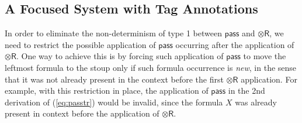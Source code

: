 \documentclass[submission,copyright,creativecommons]{eptcs}
\theoremstyle{definition}
\newcommand{\tr}{\otimes \mathsf{R}}
\newcommand{\lright}{{\multimap}\mathsf{R}}
\newcommand{\lleft}{{\multimap}\mathsf{L}}
\newcommand{\pass}{\mathsf{pass}}
\newcommand{\ax}{\mathsf{ax}}
\newcommand{\ot}{\otimes}
\newcommand{\lolli}{\multimap}
\newcommand{\RI}{\mathsf{RI}}
\newcommand{\LI}{\mathsf{LI}}
\newcommand{\Pass}{\mathsf{P}}
\newcommand{\F}{\mathsf{F}}
\newcommand{\NMILL}{\texttt{NMILL}}
\newcommand{\SkNMILL}{\NMILL\textsuperscript{\textit{s}}}
\begin{document}
%

\subsection{A Focused System with Tag Annotations}\label{sec:tag}

In order to eliminate the non-determinism of type 1 between $\pass$ and $\tr$, we need to restrict the possible application of $\pass$ occurring after the application of $\tr$. 
One way to achieve this is by forcing such application of $\pass$ to move the leftmost formula to the stoup only if such formula occurrence is \emph{new}, in the sense that it was not already present in the context before the first $\tr$ application. For example, with this restriction in place, the application of $\pass$ in the 2nd derivation of (\ref{eq:passtr}) would be invalid, since the formula $X$ was already present in context before the application of $\tr$.
\end{document}
